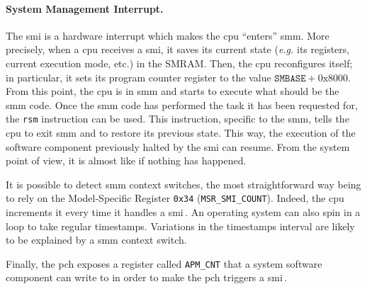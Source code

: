 \paragraph{System Management Interrupt.}

The \ac{smi} is a hardware interrupt which makes the \ac{cpu}  ``enters''
\ac{smm}.
%
More precisely, when a \ac{cpu} receives a \ac{smi}, it saves its current state
(\emph{e.g.} its registers, current execution mode, etc.) in the SMRAM.
%
Then, the \ac{cpu} reconfigures itself;
%
in particular, it sets its program counter register to the value
$\mathtt{SMBASE} + \mathrm{0x8000}$.
%
From this point, the \ac{cpu} is in \ac{smm} and starts to execute what should
be the \ac{smm} code.
%
Once the \ac{smm} code has performed the task it has been requested for, the
\texttt{rsm} instruction can be used.
%
This instruction, specific to the \ac{smm}, tells the \ac{cpu} to exit \ac{smm}
and to restore its previous state.
%
This way, the execution of the software component previously halted by the
\ac{smi} can resume.
%
From the system point of view, it is almost like if nothing has happened.

It is possible to detect \ac{smm} context switches, the most straightforward way
being to rely on the Model-Specific Register \texttt{0x34}
(\texttt{MSR\_SMI\_COUNT}).
%
Indeed, the \ac{cpu} increments it every time it handles a
\ac{smi}\,\cite[Volume 4, Chapter 2]{intel2014manual}.
%
An operating system can also spin in a loop to take regular timestamps.
%
Variations in the timestamps interval are likely to be explained by a \ac{smm}
context switch. 

Finally, the \ac{pch} exposes a register called \texttt{APM\_CNT} that a system
software component can write to in order to make the \ac{pch} triggers a
\ac{smi}\,\cite{intel2012pch}. 

